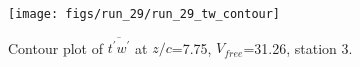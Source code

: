 \begin{figure}[H]
\centering
\texttt{[image: figs/run\_29/run\_29\_tw\_contour]}
\caption{Contour plot of $\overline{t^\prime w^\prime}$ at $z/c$=7.75, $V_{free}$=31.26, station 3.}
\label{fig:run_29_tw_contour}
\end{figure}


